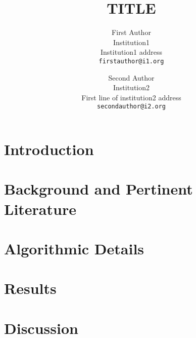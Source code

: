 \documentclass[10pt,twocolumn,letterpaper]{article}
\begin{document}
\title{TITLE}

\author{First Author\\
Institution1\\
Institution1 address\\
{\tt\small firstauthor@i1.org}
\and
Second Author\\
Institution2\\
First line of institution2 address\\
{\tt\small secondauthor@i2.org}
}

\maketitle
\thispagestyle{empty}


\begin{abstract}

\end{abstract}

\section{Introduction}


\section{Background and Pertinent Literature}


\section{Algorithmic Details}


\section{Results}


\section{Discussion}


{\small


}
\end{document}
